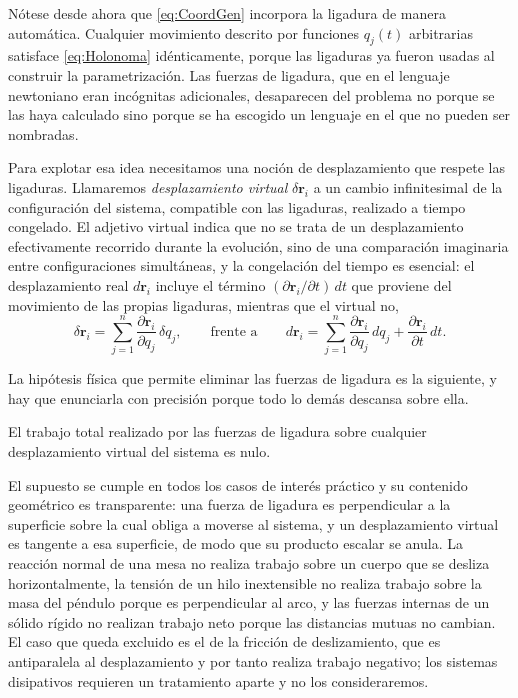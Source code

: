         Nótese desde ahora que \eqref{eq:CoordGen} incorpora la ligadura de manera automática. Cualquier movimiento descrito por funciones $q_{j}(t)$ arbitrarias satisface \eqref{eq:Holonoma} idénticamente, porque las ligaduras ya fueron usadas al construir la parametrización. Las fuerzas de ligadura, que en el lenguaje newtoniano eran incógnitas adicionales, desaparecen del problema no porque se las haya calculado sino porque se ha escogido un lenguaje en el que no pueden ser nombradas.

        Para explotar esa idea necesitamos una noción de desplazamiento que respete las ligaduras. Llamaremos \textit{desplazamiento virtual} $\delta\mathbf{r}_{i}$ a un cambio infinitesimal de la configuración del sistema, compatible con las ligaduras, realizado a tiempo congelado. El adjetivo virtual indica que no se trata de un desplazamiento efectivamente recorrido durante la evolución, sino de una comparación imaginaria entre configuraciones simultáneas, y la congelación del tiempo es esencial: el desplazamiento real $d\mathbf{r}_{i}$ incluye el término $(\partial\mathbf{r}_{i}/\partial t)\,dt$ que proviene del movimiento de las propias ligaduras, mientras que el virtual no,
        \begin{equation}\label{eq:DespVirtual}
            \delta\mathbf{r}_{i} = \sum_{j=1}^{n}\frac{\partial\mathbf{r}_{i}}{\partial q_{j}}\,\delta q_{j},
            \qquad\text{frente a}\qquad
            d\mathbf{r}_{i} = \sum_{j=1}^{n}\frac{\partial\mathbf{r}_{i}}{\partial q_{j}}\,dq_{j} + \frac{\partial\mathbf{r}_{i}}{\partial t}\,dt .
        \end{equation}

        La hipótesis física que permite eliminar las fuerzas de ligadura es la siguiente, y hay que enunciarla con precisión porque todo lo demás descansa sobre ella.

        \begin{Assumption}\label{sup:TrabajoVirtual}
            El trabajo total realizado por las fuerzas de ligadura sobre cualquier desplazamiento virtual del sistema es nulo.
        \end{Assumption}

        El supuesto se cumple en todos los casos de interés práctico y su contenido geométrico es transparente: una fuerza de ligadura es perpendicular a la superficie sobre la cual obliga a moverse al sistema, y un desplazamiento virtual es tangente a esa superficie, de modo que su producto escalar se anula. La reacción normal de una mesa no realiza trabajo sobre un cuerpo que se desliza horizontalmente, la tensión de un hilo inextensible no realiza trabajo sobre la masa del péndulo porque es perpendicular al arco, y las fuerzas internas de un sólido rígido no realizan trabajo neto porque las distancias mutuas no cambian. El caso que queda excluido es el de la fricción de deslizamiento, que es antiparalela al desplazamiento y por tanto realiza trabajo negativo; los sistemas disipativos requieren un tratamiento aparte y no los consideraremos.

